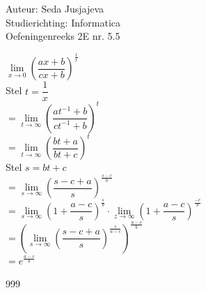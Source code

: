 \documentclass[a4paper]{article}
\begin{document}
\noindent \large Auteur: Seda Jusjajeva\\
\noindent \large Studierichting: Informatica\\
\noindent \large Oefeningenreeks 2E nr. 5.5 \\

\medskip

\normalsize


$\lim\limits_{x \rightarrow 0} \left(\dfrac{ax+b}{cx+b}\right)^{\tfrac{1}{x}}$ \\

Stel $t = \dfrac{1}{x}$ \\

$= \lim\limits_{t \rightarrow \infty} \left(\dfrac{at^{-1}+b}{ct^{-1}+b}\right)^{t}$ \\

$= \lim\limits_{t \rightarrow \infty} \left(\dfrac{bt+a}{bt+c}\right)^{t}$ \\

Stel $s = bt + c$ \\

$= \lim\limits_{s \rightarrow \infty} \left(\dfrac{s - c + a}{s}\right)^{\tfrac{s - c}{b}}$ \\

$= \lim\limits_{s \rightarrow \infty} \left(1 + \dfrac{a - c}{s}\right)^{\tfrac{s}{b}} \cdot \lim\limits_{z \rightarrow \infty} \left(1 + \dfrac{a-c}{s}\right)^{\tfrac{-c}{b}}$ \\

$= \left(\lim\limits_{s \rightarrow \infty} \left(\dfrac{s-c+a}{s}\right)^{\tfrac{s}{a-c}}\right)^{\tfrac{a-c}{b}}$ \\

$= e^{\tfrac{a-c}{b}}$ \\




\begin{thebibliography}{999}
\end{thebibliography}
\end{document}
